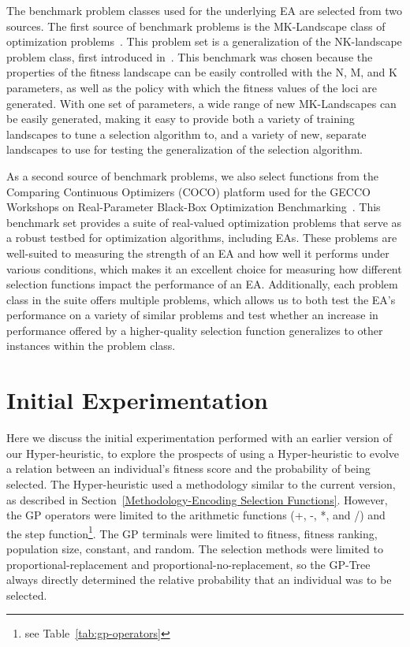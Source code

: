 \documentclass[sigconf]{acmart}
\begin{document}
The benchmark problem classes used for the underlying EA are selected from two sources. The first source of benchmark problems is the MK-Landscape class of optimization problems~\citep{whitley2016gray}. This problem set is a generalization of the NK-landscape problem class, first introduced in~\citep{kaufmann1993origins}. This benchmark was chosen because the properties of the fitness landscape can be easily controlled with the N, M, and K parameters, as well as the policy with which the fitness values of the loci are generated. With one set of parameters, a wide range of new MK-Landscapes can be easily generated, making it easy to provide both a variety of training landscapes to tune a selection algorithm to, and a variety of new, separate landscapes to use for testing the generalization of the selection algorithm. 

As a second source of benchmark problems, we also select functions from the Comparing Continuous Optimizers (COCO) platform used for the GECCO Workshops on Real-Parameter Black-Box Optimization Benchmarking~\citep{cocobbob}. This benchmark set provides a suite of real-valued optimization problems that serve as a robust testbed for optimization algorithms, including EAs. These problems are well-suited to measuring the strength of an EA and how well it performs under various conditions, which makes it an excellent choice for measuring how different selection functions impact the performance of an EA. Additionally, each problem class in the suite offers multiple problems, which allows us to both test the EA's performance on a variety of similar problems and test whether an increase in performance offered by a higher-quality selection function generalizes to other instances within the problem class.

\section{Initial Experimentation}
\label{Initial Experimentation}
Here we discuss the initial experimentation performed with an earlier version of our Hyper-heuristic, to explore the prospects of using a Hyper-heuristic to evolve a relation between an individual's fitness score and the probability of being selected. The Hyper-heuristic used a methodology similar to the current version, as described in Section~\ref{Methodology-Encoding Selection Functions}. However, the GP operators were limited to the arithmetic functions (+, -, *, and /) and the step function\footnote{see Table~\ref{tab:gp-operators}}. The GP terminals were limited to fitness, fitness ranking, population size, constant, and random. The selection methods were limited to proportional-replacement and proportional-no-replacement, so the GP-Tree always directly determined the relative probability that an individual was to be selected.
\end{document}
